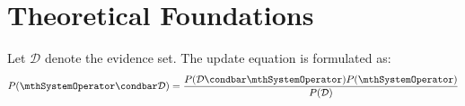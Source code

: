 \chapter{Theoretical Foundations}
\begin{definition}
Let $\mathcal{D}$ denote the evidence set. The update equation is formulated as:
\begin{equation}
P(\mthSystemOperator \condbar \mathcal{D}) = \frac{P(\mathcal{D} \condbar \mthSystemOperator) P(\mthSystemOperator)}{P(\mathcal{D})}
\end{equation}
\end{definition}

